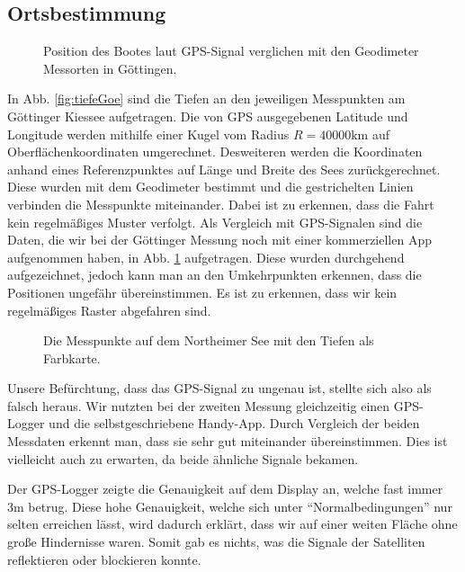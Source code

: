\documentclass[12pt,a4paper,titlepage,headinclude,bibtotoc]{scrartcl}
\numberwithin{equation}{subsection}
\begin{document}
\subsection{Ortsbestimmung}
\label{sec:ausort}
\begin{figure}[!h]
\centering

\caption{Position des Bootes laut GPS-Signal verglichen mit den Geodimeter Messorten in Göttingen.}
\label{fig:GPSGoe}
\end{figure}

In Abb. \ref{fig:tiefeGoe} sind die Tiefen an den jeweiligen Messpunkten am Göttinger Kiessee aufgetragen.
Die von GPS ausgegebenen Latitude und Longitude werden mithilfe einer Kugel vom Radius $R=40000\si{\kilo\meter}$ auf Oberflächenkoordinaten umgerechnet.
Desweiteren werden die Koordinaten anhand eines Referenzpunktes auf Länge und Breite des Sees zurückgerechnet.
Diese wurden mit dem Geodimeter bestimmt und die gestrichelten Linien verbinden die Messpunkte miteinander.
Dabei ist zu erkennen, dass die Fahrt kein regelmäßiges Muster verfolgt.
Als Vergleich mit GPS-Signalen sind die Daten, die wir bei der Göttinger Messung noch mit einer kommerziellen App aufgenommen haben, in Abb. \ref{fig:GPSGoe} aufgetragen.
Diese wurden durchgehend aufgezeichnet, jedoch kann man an den Umkehrpunkten erkennen, dass die Positionen ungefähr übereinstimmen.
Es ist zu erkennen, dass wir kein regelmäßiges Raster abgefahren sind.

\begin{figure}[!h]
	\centering
	
	\caption{Die Messpunkte auf dem Northeimer See mit den Tiefen als Farbkarte.}
	\label{fig:GPSNort}
\end{figure}

Unsere Befürchtung, dass das GPS-Signal zu ungenau ist, stellte sich also als falsch heraus.
Wir nutzten bei der zweiten Messung gleichzeitig einen GPS-Logger und die selbstgeschriebene Handy-App.
Durch Vergleich der beiden Messdaten erkennt man, dass sie sehr gut miteinander übereinstimmen.
Dies ist vielleicht auch zu erwarten, da beide ähnliche Signale bekamen.

Der GPS-Logger zeigte die Genauigkeit auf dem Display an, welche fast immer 3m betrug.
Diese hohe Genauigkeit, welche sich unter "`Normalbedingungen"' nur selten erreichen lässt, wird dadurch erklärt, dass wir auf einer weiten Fläche ohne große Hindernisse waren.
Somit gab es nichts, was die Signale der Satelliten reflektieren oder blockieren konnte.
\end{document}
